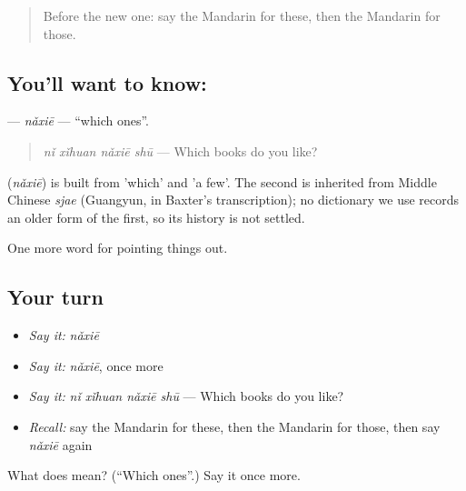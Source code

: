 \label{lesson:ZH-C127-naxie-which}



\begin{quote}
Before the new one: say the Mandarin for these, then the Mandarin for those.
\end{quote}

\subsection*{You'll want to know: }
\textbf{} — \emph{nǎxiē} — \textquotedblleft{}which ones\textquotedblright{}.

\begin{quote}
\textbf{} \emph{nǐ xǐhuan nǎxiē shū} — Which books do you like?
\end{quote}

\begin{cousinweb}
\textbf{} (\emph{nǎxiē}) is built from  'which' and  'a few'. The second is inherited from Middle Chinese \emph{sjae} (Guangyun, in Baxter's transcription); no dictionary we use records an older form of the first, so its history is not settled.
\end{cousinweb}

\begin{grammarlens}[title={What you've built}]
One more word for pointing things out.
\end{grammarlens}

\subsection*{Your turn}
\begin{itemize}
\raggedright
  \item \emph{Say it:} \emph{nǎxiē}
  \item \emph{Say it:} \emph{nǎxiē}, once more
  \item \emph{Say it:} \emph{nǐ xǐhuan nǎxiē shū} — Which books do you like?
  \item \emph{Recall:} say the Mandarin for these, then the Mandarin for those, then say \emph{nǎxiē} again
\end{itemize}

\begin{tcolorbox}[breakable,colback=teal!4,colframe=teal!35!black,title={Before you move on}]
What does  mean? (\textquotedblleft{}Which ones\textquotedblright{}.) Say it once more.
\end{tcolorbox}
